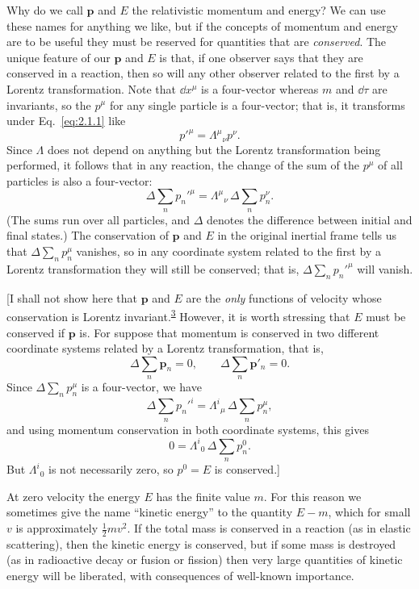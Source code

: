 Why do we call \(\mathbf p\) and \(E\) the relativistic momentum and energy?
We can use these names for anything we like, but if the concepts of momentum
and energy are to be useful they must be reserved for quantities that are
\emph{conserved}. The unique feature of our \(\mathbf p\) and \(E\) is that,
if one observer says that they are conserved in a reaction, then so will any
other observer related to the first by a Lorentz transformation. Note that
\(\dd x^\mu\) is a four-vector whereas \(m\) and \(\dd\tau\) are invariants, so the
\(p^\mu\) for any single particle is a four-vector; that is, it transforms under
Eq.~\eqref{eq:2.1.1} like
\[
  p'^\mu=\Lambda^\mu{}_\nu p^\nu .
\]
Since \(\Lambda\) does not depend on anything but the Lorentz transformation
being performed, it follows that in any reaction, the change of the sum of the
\(p^\mu\) of all particles is also a four-vector:
\[
  \Delta\sum_n p_n'^\mu
  =\Lambda^\mu{}_\nu\,\Delta\sum_n p_n^\nu .
\]
(The sums run over all particles, and \(\Delta\) denotes the difference between
initial and final states.) The conservation of \(\mathbf p\) and \(E\) in the
original inertial frame tells us that \(\Delta\sum_n p_n^\mu\) vanishes, so in
any coordinate system related to the first by a Lorentz transformation they will
still be conserved; that is, \(\Delta\sum_n p_n'^\mu\) will vanish.

[I shall not show here that \(\mathbf p\) and \(E\) are the \emph{only}
functions of velocity whose conservation is Lorentz
invariant.\textsuperscript{\hyperref[ch2-ref-3]{3}} However, it is worth
stressing that \(E\) must be conserved if \(\mathbf p\) is. For suppose that
momentum is conserved in two different coordinate systems related by a Lorentz
transformation, that is,
\[
  \Delta\sum_n\mathbf p_n=0,
  \qquad
  \Delta\sum_n\mathbf p'_n=0 .
\]
Since \(\Delta\sum_n p_n^\mu\) is a four-vector, we have
\[
  \Delta\sum_n p_n'^i
  =\Lambda^i{}_\mu\,\Delta\sum_n p_n^\mu ,
\]
and using momentum conservation in both coordinate systems, this gives
\[
  0=\Lambda^i{}_0\,\Delta\sum_n p_n^0 .
\]
But \(\Lambda^i{}_0\) is not necessarily zero, so \(p^0=E\) is conserved.]

At zero velocity the energy \(E\) has the finite value \(m\). For this reason
we sometimes give the name ``kinetic energy'' to the quantity \(E-m\), which
for small \(v\) is approximately \(\tfrac12mv^2\). If the total mass is
conserved in a reaction (as in elastic scattering), then the kinetic energy is
conserved, but if some mass is destroyed (as in radioactive decay or fusion or
fission) then very large quantities of kinetic energy will be liberated, with
consequences of well-known importance.

